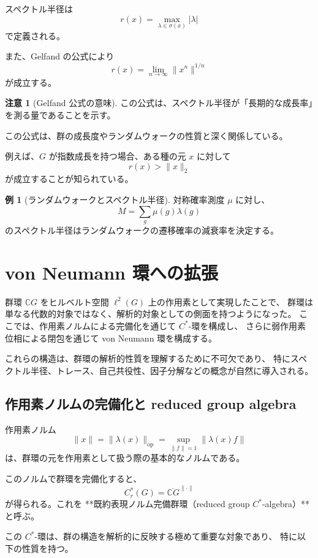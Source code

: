 \documentclass[12pt,a4paper]{ltjarticle}
\theoremstyle{definition}
\newtheorem*{remark}{注意}
\newtheorem*{example}{例}
\begin{document}
スペクトル半径は
\[
r(x) = \max_{\lambda \in \sigma(x)} |\lambda|
\]
で定義される。

また、Gelfand の公式により
\[
r(x) = \lim_{n \to \infty} \|x^n\|^{1/n}
\]
が成立する。

\begin{remark}[Gelfand 公式の意味]
この公式は、スペクトル半径が「長期的な成長率」を測る量であることを示す。
\end{remark}

この公式は、群の成長度やランダムウォークの性質と深く関係している。

例えば、$G$ が指数成長を持つ場合、ある種の元 $x$ に対して
\[
r(x) > \|x\|_2
\]
が成立することが知られている。

\begin{example}[ランダムウォークとスペクトル半径]
対称確率測度 $\mu$ に対し、
\[
M=\sum_g \mu(g)\lambda(g)
\]
のスペクトル半径はランダムウォークの遷移確率の減衰率を決定する。
\end{example}

\section{von Neumann 環への拡張}

群環 $\mathbb{C}G$ をヒルベルト空間 $\ell^2(G)$ 上の作用素として実現したことで、
群環は単なる代数的対象ではなく、解析的対象としての側面を持つようになった。
ここでは、作用素ノルムによる完備化を通じて $C^*$-環を構成し、
さらに弱作用素位相による閉包を通じて von Neumann 環を構成する。

これらの構造は、群環の解析的性質を理解するために不可欠であり、
特にスペクトル半径、トレース、自己共役性、因子分解などの概念が自然に導入される。

\subsection{作用素ノルムの完備化と reduced group algebra}

作用素ノルム
\[
\|x\| = \|\lambda(x)\|_{\mathrm{op}}
= \sup_{\|f\|=1} \|\lambda(x)f\|
\]
は、群環の元を作用素として扱う際の基本的なノルムである。

このノルムで群環を完備化すると、
\[
C^*_r(G) = \overline{\mathbb{C}G}^{\|\cdot\|}
\]
が得られる。これを **既約表現ノルム完備群環（reduced group $C^*$-algebra）** と呼ぶ。

この $C^*$-環は、群の構造を解析的に反映する極めて重要な対象であり、
特に以下の性質を持つ。
\end{document}
